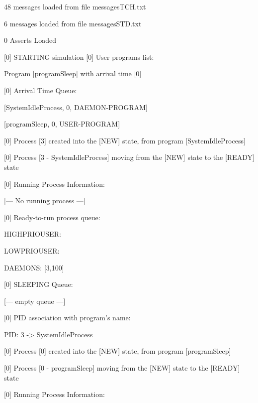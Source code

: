 48 messages loaded from file messagesTCH.txt

6 messages loaded from file messagesSTD.txt

0 Asserts Loaded

[\textcolor{termred}{0}] \textcolor{termred}{STARTING simulation
}[\textcolor{termred}{0}] User programs list:

	Program [\textcolor{termcyan}{programSleep}] with arrival time [\textcolor{termcyan}{0}]

	[\textcolor{termred}{0}] Arrival Time Queue:

		[\textcolor{termgreen}{SystemIdleProcess}, \textcolor{termred}{0}, \textcolor{termgreen}{DAEMON-PROGRAM}]

		[\textcolor{termgreen}{programSleep}, \textcolor{termred}{0}, \textcolor{termgreen}{USER-PROGRAM}]

	[\textcolor{termred}{0}] Process [\textcolor{termgreen}{3}] created into the [\textcolor{termgreen}{NEW}] state, from program [\textcolor{termgreen}{SystemIdleProcess}]

	[\textcolor{termred}{0}] Process [\textcolor{termgreen}{3} - \textcolor{termgreen}{SystemIdleProcess}] moving from the [\textcolor{termgreen}{NEW}] state to the [\textcolor{termgreen}{READY}] state

	[\textcolor{termred}{0}] Running Process Information:

		[--- No running process ---]

	[\textcolor{termred}{0}] Ready-to-run process queue:

 		HIGHPRIOUSER: 

		LOWPRIOUSER: 

		DAEMONS: [\textcolor{termgreen}{3},100]

	[\textcolor{termred}{0}] SLEEPING Queue:

		[--- empty queue ---]

	[\textcolor{termred}{0}] PID association with program's name:

		PID: \textcolor{termgreen}{3} -> SystemIdleProcess

	[\textcolor{termred}{0}] Process [\textcolor{termgreen}{0}] created into the [\textcolor{termgreen}{NEW}] state, from program [\textcolor{termgreen}{programSleep}]

	[\textcolor{termred}{0}] Process [\textcolor{termgreen}{0} - \textcolor{termgreen}{programSleep}] moving from the [\textcolor{termgreen}{NEW}] state to the [\textcolor{termgreen}{READY}] state

	[\textcolor{termred}{0}] Running Process Information:

